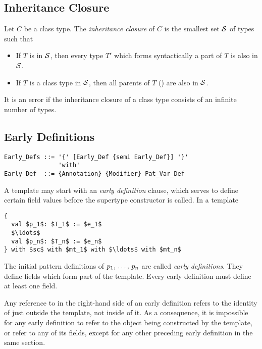 \subsection{Inheritance Closure}
\label{sec:inheritance-closure}

\newcommand{\inheritclosure}{{\cal S}}

Let $C$ be a class type. The {\em inheritance closure} of $C$ is the smallest set $\inheritclosure$ of types such that
\begin{itemize}
\item If $T$ is in $\inheritclosure$, then every type $T'$ which forms syntactically a part of $T$ is also in $\inheritclosure$. 
\item If $T$ is a class type in $\inheritclosure$, then all parents of $T$ () are also in $\inheritclosure$. 
\end{itemize}
It is an error if the inheritance closure of a class type consists of an infinite number of types. 






\subsection{Early Definitions}
\label{sec:early-defs}

\syntax\begin{lstlisting}
Early_Defs ::= '{' [Early_Def {semi Early_Def}] '}' 
               'with'
Early_Def  ::= {Annotation} {Modifier} Pat_Var_Def
\end{lstlisting}

A template may start with an {\em early definition} clause, which serves to define certain field values before the supertype constructor is called. In a template
\begin{lstlisting}
{
  val $p_1$: $T_1$ := $e_1$
  $\ldots$
  val $p_n$: $T_n$ := $e_n$
} with $sc$ with $mt_1$ with $\ldots$ with $mt_n$
\end{lstlisting}
The initial pattern definitions of $p_1 ,\, \ldots ,\, p_n$ are called {\em early definitions}. They define fields which form part of the template. Every early definition must define at least one field. 

Any reference to  in the right-hand side of an early definition refers to the identity of  just outside the template, not inside of it. As a consequence, it is impossible for any early definition to refer to the object being constructed by the template, or refer to any of its fields, except for any other preceding early definition in the same section. 







